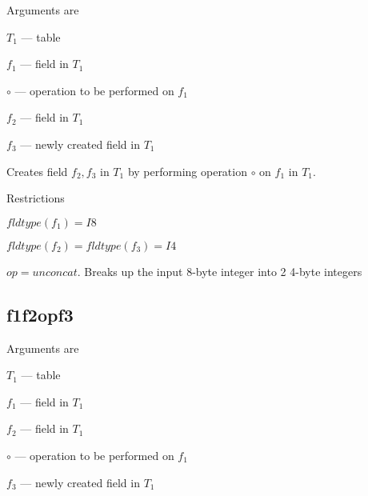 Arguments are 
\be
\item \(T_1\) --- table
\item \(f_1\) --- field in \(T_1\)
\item \(\circ\)  --- operation to be performed on \(f_1\)
\item \(f_2\) --- field in \(T_1\)
\item \(f_3\) --- newly created field in \(T_1\)
\ee

Creates field \(f_2, f_3\) in \(T_1\) by performing operation \(\circ\) on
\(f_1\) in \(T_1\). 

Restrictions
\be
\item \(fldtype(f_1) = I8\)
\item \(fldtype(f_2) = fldtype(f_3)= I4\)
\item \(op = unconcat\). Breaks up the input 8-byte integer into 2
4-byte integers
\ee

\subsection{f1f2opf3}
\label{f1f2opf3}

Arguments are 
\be
\item \(T_1\) --- table
\item \(f_1\) --- field in \(T_1\)
\item \(f_2\) --- field in \(T_1\)
\item \(\circ\)  --- operation to be performed on \(f_1\)
\item \(f_3\) --- newly created field in \(T_1\)
\ee

